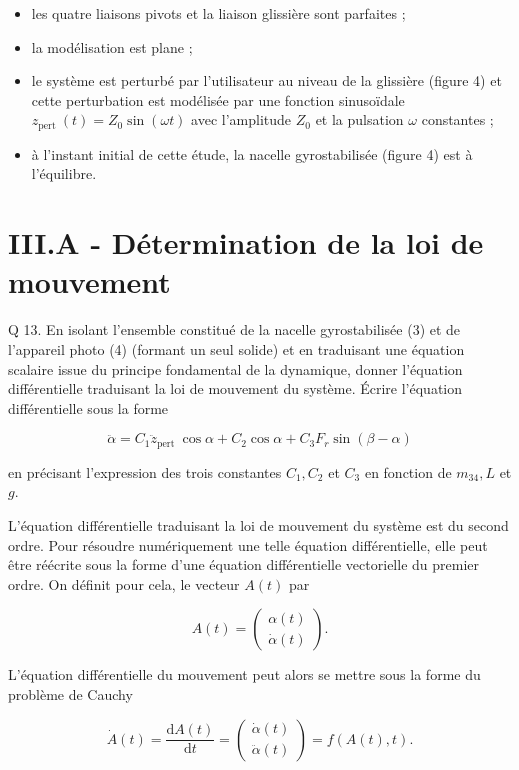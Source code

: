 \documentclass[10pt]{article}
\begin{document}
\begin{itemize}
  \item les quatre liaisons pivots et la liaison glissière sont parfaites ;

  \item la modélisation est plane ;

  \item le système est perturbé par l'utilisateur au niveau de la glissière (figure 4) et cette perturbation est modélisée par une fonction sinusoïdale $z_{\text {pert }}(t)=Z_{0} \sin (\omega t)$ avec l'amplitude $Z_{0}$ et la pulsation $\omega$ constantes ;

  \item à l'instant initial de cette étude, la nacelle gyrostabilisée (figure 4) est à l'équilibre.

\end{itemize}

\section{III.A - Détermination de la loi de mouvement}
Q 13. En isolant l'ensemble constitué de la nacelle gyrostabilisée (3) et de l'appareil photo (4) (formant un seul solide) et en traduisant une équation scalaire issue du principe fondamental de la dynamique, donner l'équation différentielle traduisant la loi de mouvement du système. Écrire l'équation différentielle sous la forme

$$
\ddot{\alpha}=C_{1} \ddot{z}_{\text {pert }} \cos \alpha+C_{2} \cos \alpha+C_{3} F_{r} \sin (\beta-\alpha)
$$

en précisant l'expression des trois constantes $C_{1}, C_{2}$ et $C_{3}$ en fonction de $m_{34}, L$ et $g$.

L'équation différentielle traduisant la loi de mouvement du système est du second ordre. Pour résoudre numériquement une telle équation différentielle, elle peut être réécrite sous la forme d'une équation différentielle vectorielle du premier ordre. On définit pour cela, le vecteur $A(t)$ par

$$
A(t)=\left(\begin{array}{c}
\alpha(t) \\
\dot{\alpha}(t)
\end{array}\right) .
$$

L'équation différentielle du mouvement peut alors se mettre sous la forme du problème de Cauchy

$$
\dot{A}(t)=\frac{\mathrm{d} A(t)}{\mathrm{d} t}=\left(\begin{array}{c}
\dot{\alpha}(t) \\
\ddot{\alpha}(t)
\end{array}\right)=f(A(t), t) .
$$
\end{document}
